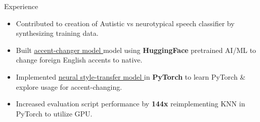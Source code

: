 \documentclass{resume} %
\begin{document}
\begin{workSection}{Experience}
	\experienceItem[
	company=UTEP,
	location=El Paso{,} TX,
	position=Undergraduate Research Assistant,
	duration=January 2024 - May 2024,
	]
	\begin{itemize}
		\vspace{-0.5em}
		\itemsep -6pt {}
		\item Contributed to creation of Autistic vs neurotypical speech classifier by
		synthesizing training data.
		\item Built \href{https://github.com/AshkanArabim/accent-change-paper-implementation}{\underline{accent-changer model \faExternalLink}} model using \textbf{HuggingFace} pretrained AI/ML to change foreign English accents to native.
		\item Implemented \href{https://github.com/AshkanArabim/neural-style-transfer}{\underline{neural style-transfer model \faExternalLink}} in \textbf{PyTorch} to learn PyTorch \& explore usage for accent-changing.
		\item Increased evaluation script performance by
			\textbf{144x} 
			reimplementing KNN in PyTorch to utilize GPU.
	\end{itemize}
	


\end{workSection}
\end{document}
